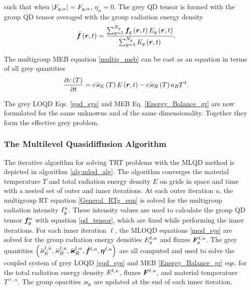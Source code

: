 	such that when $|F_{g,\alpha}| = F_{g,\alpha}$, $\eta_\alpha = 0$. The grey QD tensor is formed with the group QD tensor averaged with the group radiation energy density
	\begin{align}
		\bar{\bm{f}}\left(\bm{r},t\right) = \frac{ \sum_{g=1}^{N_g}\bm{f}_g\left(\bm{r},t\right)E_g\left(\bm{r},t\right) }{ \sum_{g=1}^{N_g}E_g\left(\bm{r},t\right) }. \label{grey_qdf}
	\end{align}
	
	The multigroup MEB equation \eqref{multig_meb} can be cast as an equation in terms of all grey quantities
	\begin{equation}
		\frac{\partial \varepsilon\left( T\right)}{\partial t} = c\bar{\varkappa}_{E}\left( T\right)E\left(\bm{r},t\right) - c\bar{\varkappa}_{B}\left( T\right)a_R T^4. \label{Energy_Balance_gr}
	\end{equation}
	
	The grey LOQD Eqs. \eqref{gqd_sys} and MEB Eq. \eqref{Energy_Balance_gr} are now formulated for the same unknowns and of the same dimensionality. Together they form the effective grey problem.
	
\subsubsection{The Multilevel Quasidiffusion Algorithm} \label{mlqd_alg}
	\ind The iterative algorithm for solving TRT problems with the MLQD method is depicted in algorithm \ref{alg:mlqd_alg}. The algorithm converges the material temperature $T$ and total radiation energy density $E$ on grids in space and time with a nested set of outer and inner iterations. At each outer iteration $u$, the multigroup RT equation \eqref{General_RTg_eqn} is solved for the multigroup radiation intensity $I_{g}^{u}$. These intensity values are used to calculate the group QD tensor $\bm{f}_g^u$ with equation \eqref{qd_tensor}, which are fixed while performing the inner iterations. For each inner iteration $\ell$, the MLOQD equations \eqref{mqd_sys} are solved for the group radiation energy densities $E_g^{\ell,u}$ and fluxes $\bm{F}_g^{\ell,u}$. The grey quantities $\left(\bar{\varkappa}_{E}^{\ell,u}, \bar{\varkappa}_{B}^{\ell,u}, \bar{\bm{\varkappa}}_{R}^{\ell,u}, \bar{\bm{f}}^{\ell,u}, \bm{\eta}^{\ell,u}\right)$ are all computed and used to solve the coupled system of grey LOQD \eqref{gqd_sys} and MEB \eqref{Energy_Balance_gr} eqs. for the total radiation energy density $E^{\ell,u}$, fluxes $\bm{F}^{\ell,u}$, and material temperature $T^{\ell,u}$. The group opacities $\varkappa_{g}$ are updated at the end of each inner iteration.
	
